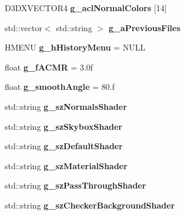 \begin{DoxyCompactItemize}
\item 
D3\+D\+X\+V\+E\+C\+T\+O\+R4 {\bfseries g\+\_\+acl\+Normal\+Colors} \mbox{[}14\mbox{]}
\item 
\hypertarget{namespace_assimp_view_aff3996cb80c2278bffe7c3b8975ca333}{std\+::vector$<$ std\+::string $>$ {\bfseries g\+\_\+a\+Previous\+Files}}\label{namespace_assimp_view_aff3996cb80c2278bffe7c3b8975ca333}

\item 
\hypertarget{namespace_assimp_view_a628857454474efe41071e5ddc03e5fea}{H\+M\+E\+N\+U {\bfseries g\+\_\+h\+History\+Menu} = N\+U\+L\+L}\label{namespace_assimp_view_a628857454474efe41071e5ddc03e5fea}

\item 
\hypertarget{namespace_assimp_view_ad4e6d2ae092c9ca5cc3be2e376d6115b}{float {\bfseries g\+\_\+f\+A\+C\+M\+R} = 3.\+0f}\label{namespace_assimp_view_ad4e6d2ae092c9ca5cc3be2e376d6115b}

\item 
\hypertarget{namespace_assimp_view_a30461de54349788ae23cf2232976fe21}{float {\bfseries g\+\_\+smooth\+Angle} = 80.f}\label{namespace_assimp_view_a30461de54349788ae23cf2232976fe21}

\item 
\hypertarget{namespace_assimp_view_ab04d1555e0886b33752d48547ff0992e}{std\+::string {\bfseries g\+\_\+sz\+Normals\+Shader}}\label{namespace_assimp_view_ab04d1555e0886b33752d48547ff0992e}

\item 
\hypertarget{namespace_assimp_view_a97233916bd76828aa8ce81dd30d90e81}{std\+::string {\bfseries g\+\_\+sz\+Skybox\+Shader}}\label{namespace_assimp_view_a97233916bd76828aa8ce81dd30d90e81}

\item 
\hypertarget{namespace_assimp_view_a6f668f073c0319479988851213c5955b}{std\+::string {\bfseries g\+\_\+sz\+Default\+Shader}}\label{namespace_assimp_view_a6f668f073c0319479988851213c5955b}

\item 
\hypertarget{namespace_assimp_view_a671cef1cc51b2f40542abccfc2af64cc}{std\+::string {\bfseries g\+\_\+sz\+Material\+Shader}}\label{namespace_assimp_view_a671cef1cc51b2f40542abccfc2af64cc}

\item 
\hypertarget{namespace_assimp_view_a9922409035d2403c2c42eaeeecbfce0a}{std\+::string {\bfseries g\+\_\+sz\+Pass\+Through\+Shader}}\label{namespace_assimp_view_a9922409035d2403c2c42eaeeecbfce0a}

\item 
\hypertarget{namespace_assimp_view_a5ccfda08205632d2d88eede5ae388ce9}{std\+::string {\bfseries g\+\_\+sz\+Checker\+Background\+Shader}}\label{namespace_assimp_view_a5ccfda08205632d2d88eede5ae388ce9}

\end{DoxyCompactItemize}


